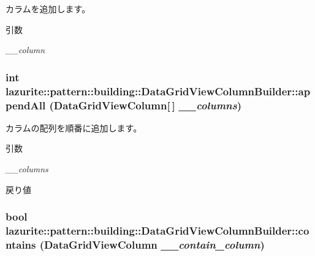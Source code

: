 カラムを追加します。 
\begin{DoxyParams}{引数}
\item[{\em \_\-\_\-column}]\end{DoxyParams}
\hypertarget{classlazurite_1_1pattern_1_1building_1_1_data_grid_view_column_builder_adb64727ec006c6b270a8c1391aa9bcd1}{
\subsubsection[{appendAll}]{\setlength{\rightskip}{0pt plus 5cm}int lazurite::pattern::building::DataGridViewColumnBuilder::appendAll (DataGridViewColumn\mbox{[}$\,$\mbox{]} {\em \_\-\_\-columns})}}
\label{classlazurite_1_1pattern_1_1building_1_1_data_grid_view_column_builder_adb64727ec006c6b270a8c1391aa9bcd1}


カラムの配列を順番に追加します。 
\begin{DoxyParams}{引数}
\item[{\em \_\-\_\-columns}]\end{DoxyParams}
\begin{DoxyReturn}{戻り値}

\end{DoxyReturn}
\hypertarget{classlazurite_1_1pattern_1_1building_1_1_data_grid_view_column_builder_a202d74ac180efeb371e78123006e8cef}{
\subsubsection[{contains}]{\setlength{\rightskip}{0pt plus 5cm}bool lazurite::pattern::building::DataGridViewColumnBuilder::contains (DataGridViewColumn {\em \_\-\_\-contain\_\-column})}}
\label{classlazurite_1_1pattern_1_1building_1_1_data_grid_view_column_builder_a202d74ac180efeb371e78123006e8cef}


